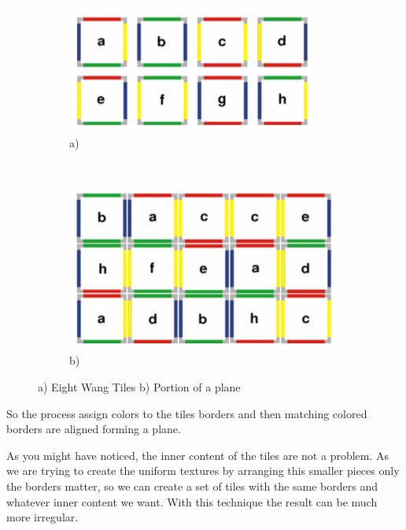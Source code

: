 \begin{figure}
        \centering
		\begin{subfigure}[b]{0.4\textwidth}
			\includegraphics[width=\textwidth]{img/Theory/Tiling/tiles.png}
			\caption{a)}
			\label{fig:TTileSet}
		\end{subfigure}
        ~ ~%
		\begin{subfigure}[b]{0.4\textwidth}
			\includegraphics[width=\textwidth]{img/Theory/Tiling/plane.png}
			\caption{b)}
			\label{fig:TPlanePortion}
		\end{subfigure}
        \caption{a) Eight Wang Tiles b) Portion of a plane}
        \label{fig:WangTiles}
\end{figure}

So the process assign colors to the tiles borders and then matching colored borders are aligned forming a plane.





As you might have noticed, the inner content of the tiles are not a problem. As we are trying to create the uniform textures by arranging this smaller pieces only the borders matter, so we can create a set of tiles with the same borders and whatever inner content we want. With this technique the result can be much more irregular. 



